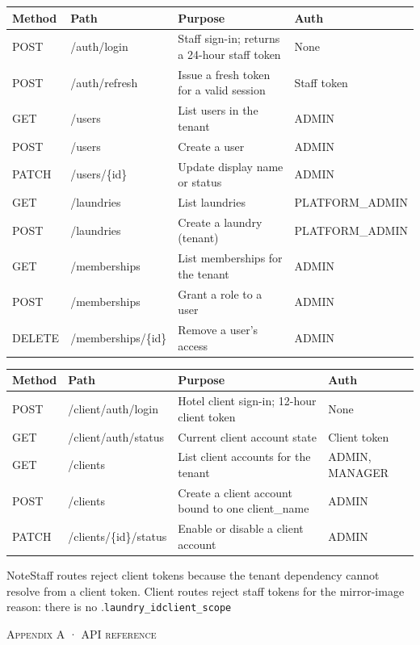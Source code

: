 \documentclass[11pt,a4paper,oneside]{book}
\begin{document}
\begin{center}\small
\begin{tabularx}{\linewidth}{|X|X|X|X|}
\hline
\rowcolor{lightgrey}
\textbf{Method} & \textbf{Path} & \textbf{Purpose} & \textbf{Auth} \\ \hline
POST & /auth/login & Staff sign-in; returns a 24-hour staff token & None \\ \hline
POST & /auth/refresh & Issue a fresh token for a valid session & Staff token \\ \hline
GET & /users & List users in the tenant & ADMIN \\ \hline
POST & /users & Create a user & ADMIN \\ \hline
PATCH & /users/\{id\} & Update display name or status & ADMIN \\ \hline
GET & /laundries & List laundries & PLATFORM\_ADMIN \\ \hline
POST & /laundries & Create a laundry (tenant) & PLATFORM\_ADMIN \\ \hline
GET & /memberships & List memberships for the tenant & ADMIN \\ \hline
POST & /memberships & Grant a role to a user & ADMIN \\ \hline
DELETE & /memberships/\{id\} & Remove a user's access & ADMIN \\ \hline
\end{tabularx}
\end{center}
\begin{center}\small
\begin{tabularx}{\linewidth}{|X|X|X|X|}
\hline
\rowcolor{lightgrey}
\textbf{Method} & \textbf{Path} & \textbf{Purpose} & \textbf{Auth} \\ \hline
POST & /client/auth/login & Hotel client sign-in; 12-hour client token & None \\ \hline
GET & /client/auth/status & Current client account state & Client token \\ \hline
GET & /clients & List client accounts for the tenant & ADMIN, MANAGER \\ \hline
POST & /clients & Create a client account bound to one client\_name & ADMIN \\ \hline
PATCH & /clients/\{id\}/status & Enable or disable a client account & ADMIN \\ \hline
\end{tabularx}
\end{center}
\begin{notebox}NoteStaff routes reject client tokens because the tenant dependency cannot resolve  from a client token. Client routes reject staff tokens for the mirror-image reason: there is no .\texttt{laundry\_id}\texttt{client\_scope}\end{notebox}
\textsc{\small\color{crimson}Appendix A · API reference}\par\medskip
\end{document}
